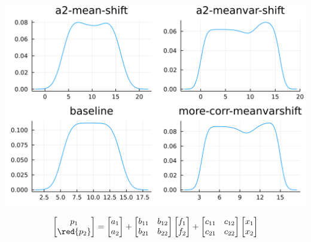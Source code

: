 \documentclass[
  ignorenonframetext,
]{beamer}
\begin{document}
\begin{frame}{}
\protect\hypertarget{section-3}{}
\begin{center}\includegraphics[width=0.95\paperheight]{complexity_files/figure-beamer/unnamed-chunk-25-1} \end{center}

\[
\begin{bmatrix}
 p_1 \\ \red{p_2}
\end{bmatrix} =
\begin{bmatrix}
 {a_1} \\ a_2
\end{bmatrix}
 + 
 \begin{bmatrix}
 b_{11} & b_{12} \\
 b_{21} & b_{22}
\end{bmatrix}
\begin{bmatrix}
 f_1 \\ f_2
\end{bmatrix}
+
 \begin{bmatrix}
 c_{11} & c_{12} \\
 c_{21} & c_{22}
\end{bmatrix}
\begin{bmatrix}
 x_1 \\ x_2
\end{bmatrix}
\]
\end{frame}
\end{document}
